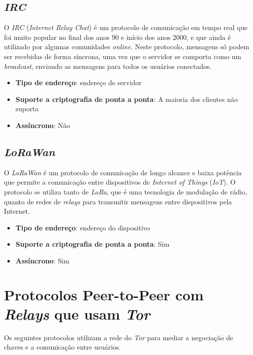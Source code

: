 \subsection{\textit{IRC}}

O \textit{IRC} (\textit{Internet Relay Chat}) é um protocolo de comunicação em tempo real que foi muito popular no final dos anos 90 e início dos anos 2000, e que ainda é utilizado por algumas comunidades \textit{online}. Neste protocolo, mensagens só podem ser recebidas de forma síncrona, uma vez que o servidor se comporta como um \textit{broadcast}, enviando as mensagens para todos os usuários conectados. \cite{rfc2810}

\begin{itemize}
  \item \textbf{Tipo de endereço}: endereço de servidor
  \item \textbf{Suporte a criptografia de ponta a ponta}: A maioria dos clientes não suporta
  \item \textbf{Assíncrono}: Não
\end{itemize}

\subsection{\textit{LoRaWan}}

O \textit{LoRaWan} é um protocolo de comunicação de longo alcance e baixa potência que permite a comunicação entre dispositivos de \textit{Internet of Things} (\textit{IoT}). O protocolo se utiliza tanto de \textit{LoRa}, que é uma tecnologia de modulação de rádio, quanto de redes de \textit{relays} para transmitir mensagens entre dispositivos pela Internet. \cite{lorawan}

\begin{itemize}
  \item \textbf{Tipo de endereço}: endereço do dispositivo
  \item \textbf{Suporte a criptografia de ponta a ponta}: Sim
  \item \textbf{Assíncrono}: Sim
\end{itemize}

\section{Protocolos Peer-to-Peer com \textit{Relays} que usam \textit{Tor}}

Os seguintes protocolos utilizam a rede do \textit{Tor} para mediar a negociação de chaves e a comunicação entre usuários.

